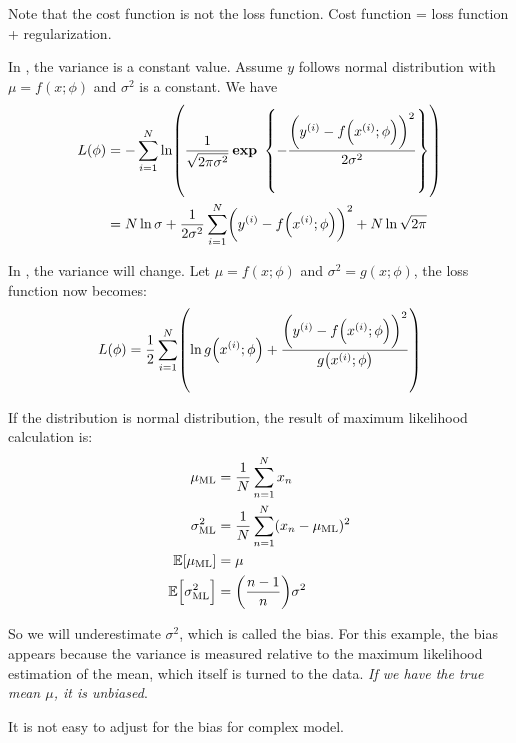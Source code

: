 Note that the cost function is not the loss function. Cost function = loss function + regularization.


In , the variance is a constant value. Assume $y$ follows normal distribution with $\mu = f(x;\phi)$ and $\sigma^2$ is a constant. We have 
\begin{equation}\label{homoscedastic_regression}
    \begin{aligned}
        L(\phi) &= - \sum_{i=1}^N \ln \mleft( \frac{1}{\sqrt{2\pi \sigma^2}} \exponential{- \frac{\mleft(\selectonesample{y}{i} - f\mleft(\selectonesample{x}{i};\phi\mright)\mright)^2}{2 \sigma^2}} \mright) \\
        &= N \ln \sigma + \frac{1}{2 \sigma^2} \sum_{i=1}^N \mleft(\selectonesample{y}{i} - f\mleft(\selectonesample{x}{i};\phi\mright)\mright)^2 + N \ln \sqrt{2\pi}
    \end{aligned}
\end{equation}


In , the variance will change. Let $\mu = f(x;\phi)$ and $\sigma^2 = g(x;\phi)$, the loss function now becomes:
\begin{equation}
    L(\phi) = \frac{1}{2} \sum_{i=1}^N \mleft(\ln g\mleft(\selectonesample{x}{i};\phi\mright) + \frac{\mleft(\selectonesample{y}{i} - f\mleft(\selectonesample{x}{i};\phi\mright)\mright)^2}{ g\mleft(\selectonesample{x}{i};\phi\mright)} \mright)
\end{equation}


\begin{definition}
    If the distribution is normal distribution, the result of maximum likelihood calculation is:
    \begin{equation}
        \begin{aligned}
            \mu_{\text{ML}} &= \frac{1}{N}\sum_{n=1}^N x_n \\
            \sigma^2_{\text{ML}} &= \frac{1}{N} \sum_{n=1}^N (x_n - \mu_{\text{ML}})^2 \\
            \expectation{\mu_{\text{ML}}} &= \mu \\
            \expectation{\sigma^2_{\text{ML}}} &= \mleft( \frac{n-1}{n} \mright) \sigma^2
        \end{aligned}
    \end{equation}
    
    So we will underestimate $\sigma^2$, which is called the bias. For this example, the bias appears because the variance is measured relative to the maximum likelihood estimation of the mean, which itself is turned to the data. \emph{If we have the true mean $\mu$, it is unbiased}.
    
    It is not easy to adjust for the bias for complex model.
\end{definition}

